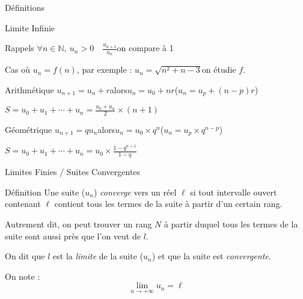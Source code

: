 \documentclass{cours}
\begin{document}
\begin{Gpartie}{Définitions}
\begin{Spartie}{Limite Infinie}
\begin{SSpartie}{Rappels}
                $\forall n\in\mathbb{N},\ u_n>0\quad\frac{u_{n+1}}{u_n}$\quad on compare à 1

                Cas où $u_n=f(n)$, par exemple : $u_n=\sqrt{n^2+n-3}$\quad on étudie $f$.
                \begin{SSSpartie}{Arithmétique} 
                    $u_{n+1}=u_n+r$\quad alors\quad $u_n=u_0+nr$\quad\big($u_n=u_p+(n-p)r$\big)

                    $S=u_0+u_1+\dotsb+u_n=\frac{u_0+u_n}{2}\times(n+1)$
                \end{SSSpartie}
                \begin{SSSpartie}{Géométrique} 
                    $u_{n+1}=qu_n$\quad alors\quad $u_n=u_0\times q^n$\quad\big($u_n=u_p\times q^{n-p}$\big)

                    $S=u_0+u_1+\dotsb+u_n=u_0\times\frac{1-q^{n+1}}{1-q}$
                \end{SSSpartie}
            \end{SSpartie}
        \end{Spartie}
        \pagebreak
        \begin{Spartie}{Limites Finies / Suites Convergentes} 
            \begin{SSpartie}{Définition} 
                Une suite ($u_n$) \emph{converge} vers un réel $\ell$ si tout intervalle ouvert contenant $\ell$ contient tous les termes de la suite à partir d'un certain rang.

                Autrement dit, on peut trouver un rang $N$ à partir duquel tous les termes de la suite sont aussi près que l'on veut de $l$.

                On dit que $l$ est la \emph{limite} de la suite ($u_n$) et que la suite est \emph{convergente}.

                On note : \[\boxed{\lim\limits_{n\to +\infty} u_n=\ell}\]


\end{SSpartie}
\end{Spartie}
\end{Gpartie}
\end{document}
